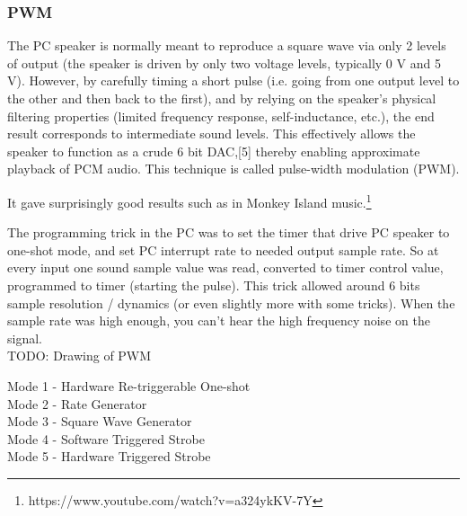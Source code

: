 \subsubsection{PWM}

\par
 \begin{fancyquotes}
  The PC speaker is normally meant to reproduce a square wave via only 2 levels of output (the speaker is driven by only two voltage levels, typically 0 V and 5 V). However, by carefully timing a short pulse (i.e. going from one output level to the other and then back to the first), and by relying on the speaker's physical filtering properties (limited frequency response, self-inductance, etc.), the end result corresponds to intermediate sound levels. This effectively allows the speaker to function as a crude 6 bit DAC,[5] thereby enabling approximate playback of PCM audio. This technique is called pulse-width modulation (PWM).
 \end{fancyquotes}
\par
  It gave surprisingly good results such as in Monkey Island music.\footnote{https://www.youtube.com/watch?v=a324ykKV-7Y}

  \par
The programming trick in the PC was to set the timer that drive PC speaker to one-shot mode, and set PC interrupt rate to needed output sample rate. So at every input one sound sample value was read, converted to timer control value, programmed to timer (starting the pulse). This trick allowed around 6 bits sample resolution / dynamics (or even slightly more with some tricks). When the sample rate was high enough, you can’t hear the high frequency noise on the signal.\\
TODO: Drawing of PWM
\par
Mode 1 - Hardware Re-triggerable One-shot\\
Mode 2 - Rate Generator\\
Mode 3 - Square Wave Generator\\
Mode 4 - Software Triggered Strobe\\
Mode 5 - Hardware Triggered Strobe\\

